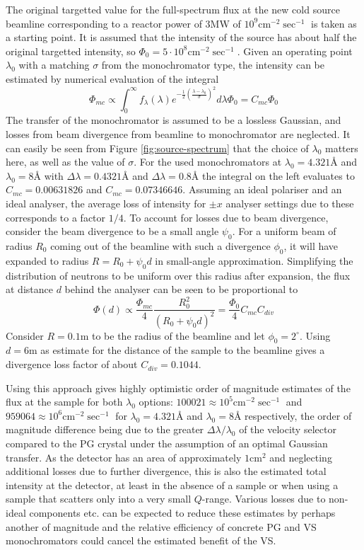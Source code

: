 \documentclass{article}
\begin{document}
The original targetted value for the full-spectrum flux at the new cold source beamline corresponding to a reactor power of $3\unit{\mega\watt}$ of $10^9 \unit{\centi\meter^{-2}\sec^{-1}}$ \cite{OYSTER2008} is taken as a starting point. It is assumed that the intensity of the source has about half the original targetted intensity, so $\Phi_0 = 5\cdot 10^8\unit{\centi\meter^{-2}\sec^{-1}}$. Given an operating point $\lambda_0$ with a matching $\sigma$ from the monochromator type, the intensity can be estimated by numerical evaluation of the integral
$$\Phi_{mc} \propto \int_0^\infty f_\lambda(\lambda)e^{-\frac{1}{2}\left(\frac{\lambda - \lambda_0}{\sigma}\right)^2}d\lambda \Phi_0= C_{mc}\Phi_0$$
The transfer of the monochromator is assumed to be a lossless Gaussian, and losses from beam divergence from beamline to monochromator are neglected.  It can easily be seen from Figure \ref{fig:source-spectrum} that the choice of $\lambda_0$ matters here, as well as the value of $\sigma$. For the used monochromators at $\lambda_0 = 4.321$Å and $\lambda_0 = 8$Å with $\Delta\lambda = 0.4321$Å and $\Delta\lambda = 0.8$Å the integral on the left evaluates to $C_{mc} = 0.00631826$ and $C_{mc} = 0.07346646$. Assuming an ideal polariser and an ideal analyser, the average loss of intensity for $\pm x$ analyser settings due to these corresponds to a factor $1/4$. To account for losses due to beam divergence, consider the beam divergence to be a small angle $\psi_0$. 
For a uniform beam of radius $R_0$ coming out of the beamline with such a divergence $\phi_0$, it will have expanded to radius $R = R_0 + \psi_0 d$ in small-angle approximation. Simplifying the distribution of neutrons to be uniform over this radius after expansion, the flux at distance $d$ behind the analyser can be seen to be proportional to
$$\Phi(d) \propto \frac{\Phi_{mc}}{4}\frac{R_0^2}{(R_0 + \psi_0 d)^2} = \frac{\Phi_0}{4}C_{mc}C_{div}$$
Consider $R = 0.1 \unit{\meter}$ to be the radius of the beamline and let $\phi_0 = 2^\circ$. Using $d = 6 \unit{\meter}$ as estimate for the distance of the sample to the beamline gives a divergence loss factor of about $C_{div} = 0.1044$.

Using this approach gives highly optimistic order of magnitude estimates of the flux at the sample for both $\lambda_0$ options: $100021 \approx 10^5 \unit{\centi\meter^{-2}\sec^{-1}}$ and $959064 \approx 10^6 \unit{\centi\meter^{-2}\sec^{-1}}$ for $\lambda_0 = 4.321$Å and $\lambda_0 = 8$Å respectively, the order of magnitude difference being due to the greater $\Delta\lambda/\lambda_0$ of the velocity selector compared to the PG crystal under the assumption of an optimal Gaussian transfer. As the detector has an area of approximately $1 \unit{\centi\meter^2}$ and neglecting additional losses due to further divergence, this is also the estimated total intensity at the detector, at least in the absence of a sample or when using a sample that scatters only into a very small $Q$-range. Various losses due to non-ideal components etc. can be expected to reduce these estimates by perhaps another of magnitude and the relative efficiency of concrete PG and VS monochromators could cancel the estimated benefit of the VS.
\end{document}
